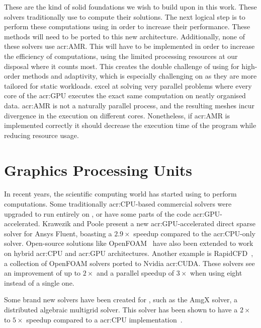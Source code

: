 These are the kind of solid foundations we wish to build upon in this work. These solvers
traditionally use  to compute their solutions. The next logical step is to
perform these computations using  in order to increase their performance. These
methods will need to be ported to this new architecture. Additionally, none of these solvers use
\acrfull{acr:AMR}. This will have to be implemented in order to increase the efficiency of
computations, using the limited processing resources at our disposal where it counts most. This
creates the double challenge of using  for high-order methods and adaptivity,
which is especially challenging on  as they are more tailored for static
workloads.  excel at solving very parallel problems where every core of the
\acrshort{acr:GPU} executes the exact same computation on neatly organised data. \Acrshort{acr:AMR}
is not a naturally parallel process, and the resulting meshes incur divergence in the execution on
different cores. Nonetheless, if \Acrshort{acr:AMR} is implemented correctly it should decrease the
execution time of the program while reducing resource usage.

\section{Graphics Processing Units}\label{section:literature_review:gpu}

In recent years, the scientific computing world has started using  to perform
computations. Some traditionally \acrshort{acr:CPU}-based commercial solvers were upgraded to run
entirely on , or have some parts of the code \acrshort{acr:GPU}-accelerated.
Krawezik and Poole present a new \acrshort{acr:GPU}-accelerated direct sparse solver for Ansys
Fluent, boasting a \(2.9 \times \) speedup compared to the \acrshort{acr:CPU}-only solver.
Open-source solutions like OpenFOAM~\cite{Alonazi2015} have also been extended to work on hybrid
\acrshort{acr:CPU} and \acrshort{acr:GPU} architectures. Another example is
RapidCFD~\cite{SimFlow2020}, a collection of OpenFOAM solvers ported to Nvidia \acrshort{acr:CUDA}.
These solvers see an improvement of up to \(2 \times \) and a parallel speedup of \(3 \times \)
when using eight  instead of a single one.

Some brand new solvers have been created for , such as the AmgX solver, a
distributed algebraic multigrid solver. This solver has been shown to have a \(2 \times \) to \(5
\times \) speedup compared to a \acrshort{acr:CPU} implementation~\cite{Naumov2015}.

